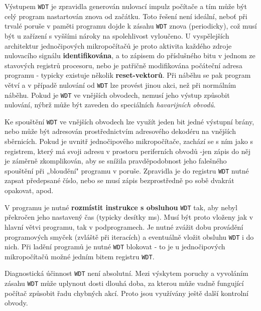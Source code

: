       Výstupem \texttt{WDT} je zpravidla generován nulovací impulz počítače a tím může být celý 
      program nastartován znova od začátku. Toto řešení není ideální, neboť při trvalé poruše v 
      paměti programu dojde k zásahu \texttt{WDT} znova (periodicky), což musí být u zařízení s 
      vyššími nároky na spolehlivost vyloučeno. U vyspělejších architektur jednočipových 
      mikropočítačů je proto aktivita každého zdroje nulovacího signálu \textbf{identifikována}, a 
      to zápisem do příslušného bitu v jednom ze stavových registrů procesoru, nebo je patřičně 
      modifikována počáteční adresa programu - typicky existuje několik \textbf{reset-vektorů}. Při 
      náběhu se pak program větví a v případě nulování od \texttt{WDT} lze provést jinou 
      akci, než při normálním náběhu. Pokud je \texttt{WDT} ve vnějších obvodech, nemusí jeho 
      výstup způsobit nulování, nýbrž může být zaveden do speciálních \emph{havarijních obvodů}.
      
      Ke spouštění \texttt{WDT} ve vnějších obvodech lze využít jeden bit jedné výstupní brány, 
      nebo může být adresován prostřednictvím adresového dekodéru na vnějších sběrnicích. Pokud je 
      uvnitř jednočipového mikropočítače, zachází se s ním jako s registrem, který má svoji adresu 
      v prostoru periferních obvodů -jen zápis do něj je záměrně zkomplikován, aby se snížila 
      pravděpodobnost jeho falešného spouštění při „bloudění" programu v poruše. Zpravidla je do 
      registru \texttt{WDT} nutné zapsat předepsané číslo, nebo se musí zápis bezprostředně po sobě 
      dvakrát opakovat, apod.
      
      V programu je nutné \textbf{rozmístit instrukce s obsluhou} \texttt{WDT} tak, aby nebyl 
      překročen jeho nastavený čas (typicky desítky ms). Musí být proto vloženy jak v hlavní větvi 
      programu, tak v podprogramech. Je nutné zvážit dobu provádění programových smyček (zvláště 
      při iteracích) a eventuálně vložit obsluhu \texttt{WDT} i do nich. Při ladění programů je 
      nutné \texttt{WDT} blokovat - to je u jednočipových mikropočítačů možné jedním bitem registru 
      \texttt{WDT}.
      
      Diagnostická účinnost \texttt{WDT} není absolutní. Mezi výskytem poruchy a vyvoláním zásahu 
      \texttt{WDT} může uplynout dosti dlouhá doba, za kterou může vadně fungující počítač způsobit 
      řadu chybných akcí. Proto jsou využívány ještě další kontrolní obvody.
      
